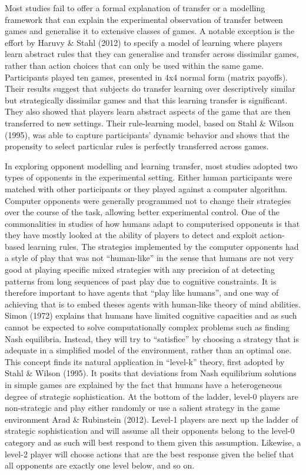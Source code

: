 \documentclass[man,floatsintext]{apa6}
\begin{document}
Most studies fail to offer a formal explanation of transfer or a modelling framework that can explain the experimental observation of transfer between games and generalise it to extensive classes of games. A notable exception is the effort by Haruvy \& Stahl (2012) to specify a model of learning where players learn abstract rules that they can generalise and transfer across dissimilar games, rather than action choices that can only be used within the same game. Participants played ten games, presented in 4x4 normal form (matrix payoffs). Their results suggest that subjects do transfer learning over descriptively similar but strategically dissimilar games and that this learning transfer is significant. They also showed that players learn abstract aspects of the game that are then transferred to new settings. Their rule-learning model, based on Stahl \& Wilson (1995), was able to capture participants' dynamic behavior and shows that the propensity to select particular rules is perfectly transferred across games.

In exploring opponent modelling and learning transfer, most studies adopted two types of opponents in the experimental setting. Either human participants were matched with other participants or they played against a computer algorithm. Computer opponents were generally programmed not to change their strategies over the course of the task, allowing better experimental control. One of the commonalities in studies of how humans adapt to computerised opponents is that they have mostly looked at the ability of players to detect and exploit action-based learning rules. The strategies implemented by the computer opponents had a style of play that was not \enquote{human-like} in the sense that humans are not very good at playing specific mixed strategies with any precision of at detecting patterns from long sequences of past play due to cognitive constraints. It is therefore important to have agents that \enquote{play like humans}, and one way of achieving that is to embed theses agents with human-like theory of mind abilities. Simon (1972) explains that humans have limited cognitive capacities and as such cannot be expected to solve computationally complex problems such as finding Nash equilibria. Instead, they will try to \enquote{satisfice} by choosing a strategy that is adequate in a simplified model of the environment, rather than an optimal one. This concept finds its natural application in \enquote{level-k} theory, first adopted by Stahl \& Wilson (1995). It posits that deviations from Nash equilibrium solutions in simple games are explained by the fact that humans have a heterogeneous degree of strategic sophistication. At the bottom of the ladder, level-0 players are non-strategic and play either randomly or use a salient strategy in the game environment Arad \& Rubinstein (2012). Level-1 players are next up the ladder of strategic sophistication and will assume all their opponents belong to the level-0 category and as such will best respond to them given this assumption. Likewise, a level-2 player will choose actions that are the best response given the belief that all opponents are exactly one level below, and so on.
\end{document}
